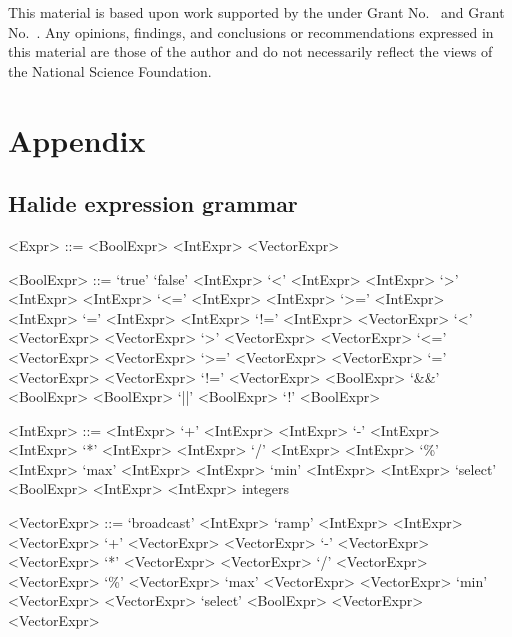 \documentclass[sigplan,10pt,review,anonymous]{acmart}\settopmatter{printfolios=true,printccs=false,printacmref=false}
\begin{document}
\begin{acks}                            %
  This material is based upon work supported by the
   under Grant
  No.~ and Grant
  No.~.  Any opinions, findings, and
  conclusions or recommendations expressed in this material are those
  of the author and do not necessarily reflect the views of the
  National Science Foundation.
\end{acks}





\appendix
\section{Appendix}

\subsection{Halide expression grammar}
\label{ss:appendixA}


\begin{grammar}
<Expr> ::= <BoolExpr> 
\alt <IntExpr> 
\alt <VectorExpr>

<BoolExpr> ::= `true'
\alt `false'
\alt <IntExpr> `<' <IntExpr>
\alt <IntExpr> `>' <IntExpr>
\alt <IntExpr> `<=' <IntExpr>
\alt <IntExpr> `>=' <IntExpr>
\alt <IntExpr> `=' <IntExpr>
\alt <IntExpr> `!=' <IntExpr>
\alt <VectorExpr> `<' <VectorExpr>
\alt <VectorExpr> `>' <VectorExpr>
\alt <VectorExpr> `<=' <VectorExpr>
\alt <VectorExpr> `>=' <VectorExpr>
\alt <VectorExpr> `=' <VectorExpr>
\alt <VectorExpr> `!=' <VectorExpr>
\alt <BoolExpr> `&&' <BoolExpr>
\alt <BoolExpr> `||' <BoolExpr>
\alt `!' <BoolExpr>

<IntExpr> ::= <IntExpr> `+' <IntExpr>
\alt <IntExpr> `-' <IntExpr>
\alt <IntExpr> `*' <IntExpr>
\alt <IntExpr> `/' <IntExpr>
\alt <IntExpr> `\%' <IntExpr>
\alt `max' <IntExpr> <IntExpr>
\alt `min' <IntExpr> <IntExpr>
\alt `select' <BoolExpr> <IntExpr> <IntExpr>
\alt integers

<VectorExpr> ::= `broadcast' <IntExpr>
\alt `ramp' <IntExpr> <IntExpr>
\alt <VectorExpr> `+' <VectorExpr>
\alt <VectorExpr> `-' <VectorExpr>
\alt <VectorExpr> `*' <VectorExpr>
\alt <VectorExpr> `/' <VectorExpr>
\alt <VectorExpr> `\%' <VectorExpr>
\alt `max' <VectorExpr> <VectorExpr>
\alt `min' <VectorExpr> <VectorExpr>
\alt `select' <BoolExpr> <VectorExpr> <VectorExpr>
\end{grammar}
\end{document}
